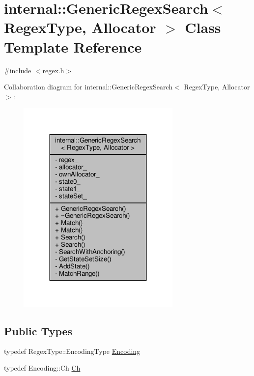 \hypertarget{classinternal_1_1GenericRegexSearch}{}\section{internal\+:\+:Generic\+Regex\+Search$<$ Regex\+Type, Allocator $>$ Class Template Reference}
\label{classinternal_1_1GenericRegexSearch}


{\ttfamily \#include $<$regex.\+h$>$}



Collaboration diagram for internal\+:\+:Generic\+Regex\+Search$<$ Regex\+Type, Allocator $>$\+:
\nopagebreak
\begin{figure}[H]
\begin{center}
\leavevmode
\includegraphics[width=227pt]{classinternal_1_1GenericRegexSearch__coll__graph}
\end{center}
\end{figure}
\subsection*{Public Types}
\begin{DoxyCompactItemize}
\item 
typedef Regex\+Type\+::\+Encoding\+Type \hyperlink{classinternal_1_1GenericRegexSearch_a7b1f81c580c33200c83e1529c2fdbf54}{Encoding}
\item 
typedef Encoding\+::\+Ch \hyperlink{classinternal_1_1GenericRegexSearch_a966f3a62fc838b5e9350f4c6a624d9a1}{Ch}
\end{DoxyCompactItemize}
